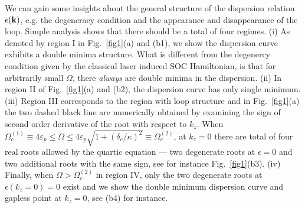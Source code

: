 \documentclass[atoms,article,submit,moreauthors,pdftex,12pt,a4paper]{mdpi}
\begin{document}
We can gain some insights about the general structure of the dispersion relation $\epsilon({\bf k})$, e.g. the degeneracy condition and the appearance and disappearance of the loop. 
Simple analysis shows that there should be a total of four regimes. 
(i) As denoted by region I in Fig.~\ref{fig1}(a) and (b1), we show the dispersion curve exhibits a double minima structure. What is different from the degenercy condition given by the classical laser induced SOC Hamiltonian, is that for arbitrarily small $\Omega$, there {\em always} are double minima in the dispersion. 
(ii) In region II of Fig.~\ref{fig1}(a) and (b2), the dispersion curve has only single minimum. 
(iii) Region III corresponds to the region with loop structure and in Fig.~\ref{fig1}(a) the two dashed black line are numerically obtained by examining the sign of second order derivative of the root with respect to $k_z$. When $\Omega_c^{(1)}\equiv4\varepsilon_p\leq \Omega \leq  4\varepsilon_p \sqrt{1+(\delta_c/\kappa)^2}\equiv\Omega_c^{(2)}$, at $k_z=0$ there are total of four real roots allowed by the quartic equation --- two degenerate roots at $\epsilon=0$ and two additional roots with the same sign, see for instance Fig.~\ref{fig1}(b3). 
(iv) Finally, when $\Omega > \Omega_c^{(2)}$ in region IV, only the two degenerate roots at $\epsilon(k_z=0)=0$ exist and we show the double minimum dispersion curve and gapless point at $k_z=0$, see (b4) for instance.  
\end{document}
